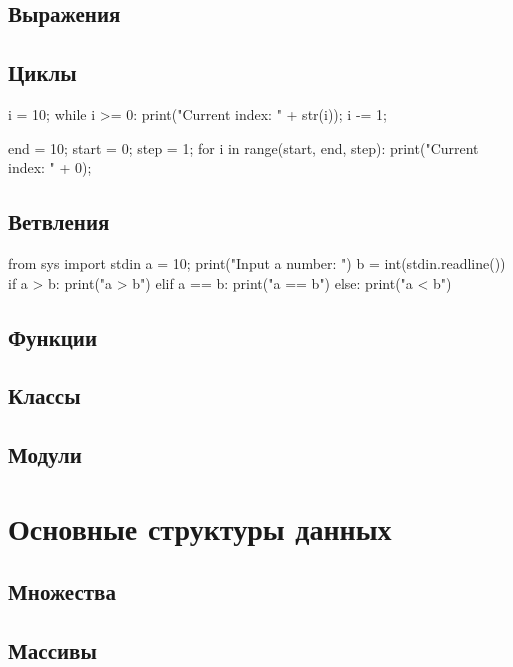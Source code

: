 \section{Выражения}

\section{Циклы}

\begin{python}
i = 10;
while i >= 0:
  print("Current index: " + str(i));
  i -= 1;
\end{python}

\begin{python}
end = 10;
start = 0;
step = 1;
for i in range(start, end, step):
  print("Current index: " + 0);
\end{python}

\section{Ветвления}

\begin{python}
from sys import stdin
a = 10;
print("Input a number: ")
b = int(stdin.readline())
if a > b:
	print("a > b")
elif a == b:
	print("a == b")
else:
	print("a < b")
\end{python}

\section{Функции}

\section{Классы}

\section{Модули}

\chapter{Основные структуры данных}

\section{Множества}

\section{Массивы}

